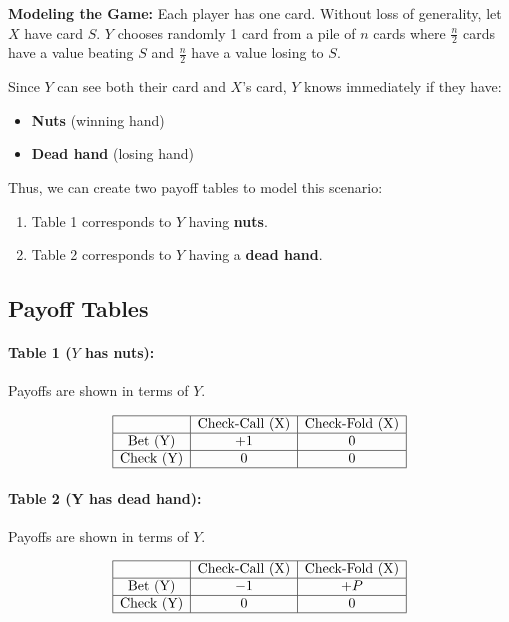 \documentclass[12pt]{article}
\begin{document}
\noindent\textbf{Modeling the Game:}  
Each player has one card. Without loss of generality, let $X$ have card $S$.  
$Y$ chooses randomly 1 card from a pile of $n$ cards where $\frac{n}{2}$ cards have a value beating $S$ and $\frac{n}{2}$ have a value losing to $S$.

Since $Y$ can see both their card and $X$'s card, $Y$ knows immediately if they have:
\begin{itemize}
    \item \textbf{Nuts} (winning hand)
    \item \textbf{Dead hand} (losing hand)
\end{itemize}

\noindent Thus, we can create two payoff tables to model this scenario:
\begin{enumerate}
    \item Table 1 corresponds to $Y$ having \textbf{nuts}.
    \item Table 2 corresponds to $Y$ having a \textbf{dead hand}.
\end{enumerate}

\subsection*{Payoff Tables}

\paragraph{Table 1 ($Y$ has nuts):}
Payoffs are shown in terms of $Y$.

\[
\begin{array}{|c|c|c|}
\hline
 & \text{Check-Call (X)} & \text{Check-Fold (X)} \\
\hline
\text{Bet (Y)} & +1 & 0 \\
\hline
\text{Check (Y)} & 0 & 0 \\
\hline
\end{array}
\]

\paragraph{Table 2 (Y has dead hand):}
Payoffs are shown in terms of $Y$.

\[
\begin{array}{|c|c|c|}
\hline
 & \text{Check-Call (X)} & \text{Check-Fold (X)} \\
\hline
\text{Bet (Y)} & -1 & +P \\
\hline
\text{Check (Y)} & 0 & 0 \\
\hline
\end{array}
\]
\end{document}
